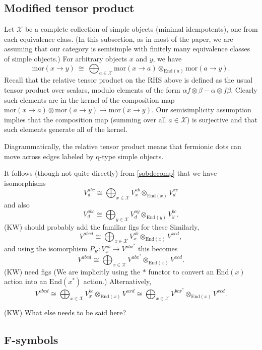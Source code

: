 \documentclass[12pt,a4paper]{article}
\newcommand{\tp}{\otimes}
\newcommand{\mcx}{\mathcal{X}}
\newcommand\be            {\begin{equation}}
\newcommand\ee            {\end{equation}}
\newcommand{\mor}{\text{mor}}
\newcommand{\End}{\text{End}}
\newcommand{\kw}[1]{{\color{kwcolor}\footnotesize{(KW) #1}}}
\begin{document}
\subsection{Modified tensor product} \label{modified_tensor_product}

Let $\mcx$ be a complete collection of simple objects (minimal idempotents), one from each equivalence class.
(In this subsection, as in most of the paper, we are assuming that our category is semisimple with finitely many equivalence
classes of simple objects.)
For arbitrary objects $x$ and $y$, we have
\be \label{sobdecomp}
	\mor(x\to y) \: \cong \: \bigoplus_{a\in\mcx} \mor(x\to a) \tp_{\End(a)} \mor(a\to y) .
\ee
Recall that the relative tensor product on the RHS above is defined as the usual tensor product over scalars, modulo elements
of the form $\alpha f \tp \beta - \alpha\tp f\beta$.
Clearly such elements are in the kernel of the composition map $\mor(x\to a) \tp \mor(a\to y) \to \mor(x\to y)$.
Our semisimplicity assumption implies that the composition map (summing over all $a\in \mcx$) is surjective and that such
elements generate all of the kernel.

Diagrammatically, the relative tensor product means that fermionic dots can move across edges labeled by q-type simple objects.

It follows (though not quite directly) from \ref{sobdecomp} that we have isomorphisms
\be \label{pfi1}
	V^{abc}_d \cong \bigoplus_{x\in \mcx} V^{ab}_x \tp_{\End(x)} V^{xc}_d
\ee
and also
\be \label{pfi2}
	V^{abc}_d \cong \bigoplus_{y\in \mcx} V^{ay}_d \tp_{\End(y)} V^{bc}_y .
\ee
\kw{should probably add the familiar figs for these}
Similarly, 
\be
	V^{abcd} \cong \bigoplus_{x\in \mcx} V^{ab}_x \tp_{\End(x)} V^{xcd} ,
\ee
and using the isomorphism $P_R: V^{ab}_x \to V^{abx^*}$ this becomes
\be  \label{pfpfi1}
	V^{abcd} \cong \bigoplus_{x\in \mcx} V^{abx^*} \tp_{\End(x)} V^{xcd} .
\ee
\kw{need figs}
(We are implicitly using the $*$ functor to convert an $\End(x)$ action into an $\End(x^*)$ action.)
Alternatively,
\be  \label{pfpfi2}
	V^{abcd} \cong \bigoplus_{x\in \mcx} V^{bc}_x \tp_{\End(x)} V^{axd} \cong \bigoplus_{x\in \mcx} V^{bcx^*} \tp_{\End(x)} V^{xcd} .
\ee




\bigskip


\kw{What else needs to be said here?}




\subsection{F-symbols} \label{Fsymbols}
\end{document}
